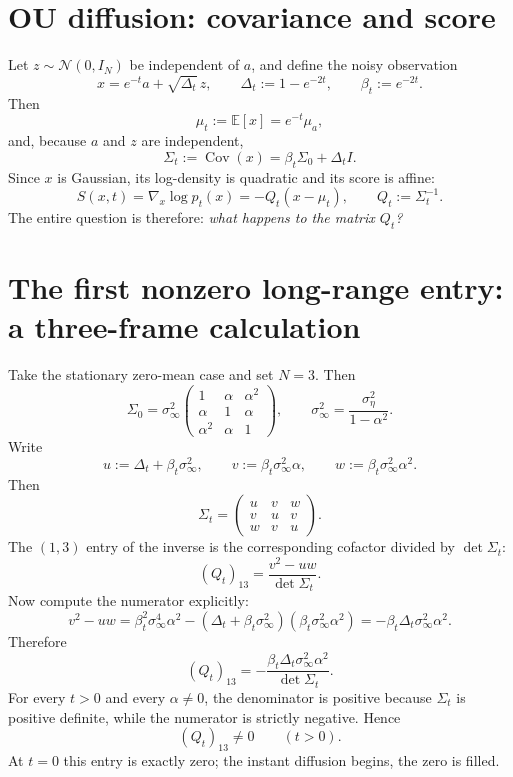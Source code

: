\documentclass[11pt]{article}
\newcommand{\E}{\mathbb{E}}
\newcommand{\Cov}{\operatorname{Cov}}
\newcommand{\Id}{I}
\newcommand{\Ncal}{\mathcal{N}}
\begin{document}
\section{OU diffusion: covariance and score}
Let $z\sim\Ncal(0,\Id_N)$ be independent of $a$, and define the noisy observation
\begin{equation}\label{eq:xt_def}
 x=e^{-t}a+\sqrt{\Delta_t}\,z,
 \qquad
 \Delta_t:=1-e^{-2t},
 \qquad
 \beta_t:=e^{-2t}.
\end{equation}
Then
\begin{equation}\label{eq:mut}
\mu_t:=\E[x]=e^{-t}\mu_a,
\end{equation}
and, because $a$ and $z$ are independent,
\begin{equation}\label{eq:sigmat}
\Sigma_t:=\Cov(x)=\beta_t\Sigma_0+\Delta_t\Id.
\end{equation}
Since $x$ is Gaussian, its log-density is quadratic and its score is affine:
\begin{equation}\label{eq:score_gaussian}
S(x,t)=\nabla_x\log p_t(x)=-Q_t(x-\mu_t),
\qquad
Q_t:=\Sigma_t^{-1}.
\end{equation}
The entire question is therefore: \emph{what happens to the matrix $Q_t$?}

\section{The first nonzero long-range entry: a three-frame calculation}
Take the stationary zero-mean case and set $N=3$. Then
\[
\Sigma_0=\sigma_\infty^2
\begin{pmatrix}
1 & \alpha & \alpha^2 \\
\alpha & 1 & \alpha \\
\alpha^2 & \alpha & 1
\end{pmatrix},
\qquad
\sigma_\infty^2=\frac{\sigma_\eta^2}{1-\alpha^2}.
\]
Write
\[
 u:=\Delta_t+\beta_t\sigma_\infty^2,
 \qquad
 v:=\beta_t\sigma_\infty^2\alpha,
 \qquad
 w:=\beta_t\sigma_\infty^2\alpha^2.
\]
Then
\[
\Sigma_t=
\begin{pmatrix}
 u & v & w \\
 v & u & v \\
 w & v & u
\end{pmatrix}.
\]
The $(1,3)$ entry of the inverse is the corresponding cofactor divided by $\det\Sigma_t$:
\begin{equation}\label{eq:13cofactor}
(Q_t)_{13}=\frac{v^2-uw}{\det\Sigma_t}.
\end{equation}
Now compute the numerator explicitly:
\[
 v^2-uw
 = \beta_t^2\sigma_\infty^4\alpha^2 - (\Delta_t+\beta_t\sigma_\infty^2)(\beta_t\sigma_\infty^2\alpha^2)
 = -\beta_t\Delta_t\sigma_\infty^2\alpha^2.
\]
Therefore
\begin{equation}\label{eq:q13_explicit}
(Q_t)_{13}=-\frac{\beta_t\Delta_t\sigma_\infty^2\alpha^2}{\det\Sigma_t}.
\end{equation}
For every $t>0$ and every $\alpha\ne 0$, the denominator is positive because $\Sigma_t$ is positive definite, while the numerator is strictly negative. Hence
\[
(Q_t)_{13}\ne 0\qquad (t>0).
\]
At $t=0$ this entry is exactly zero; the instant diffusion begins, the zero is filled.
\end{document}
